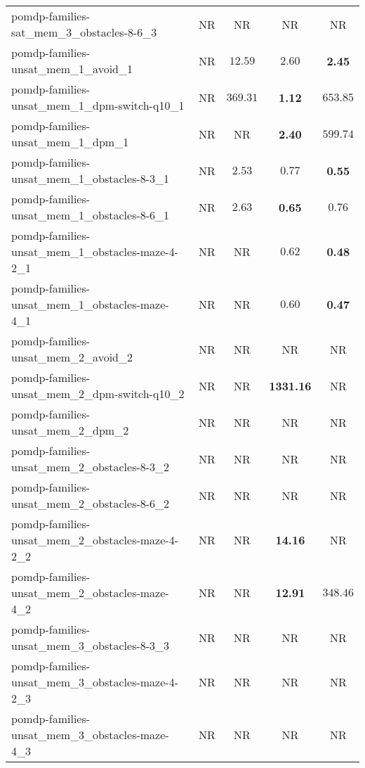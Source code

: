 \begin{tabular}{lcccc}
pomdp-families-sat\_mem\_3\_obstacles-8-6\_3 & NR & NR & NR & NR \\
pomdp-families-unsat\_mem\_1\_avoid\_1 & NR & $12.59$ & $2.60$ & \textbf{2.45} \\
pomdp-families-unsat\_mem\_1\_dpm-switch-q10\_1 & NR & $369.31$ & \textbf{1.12} & $653.85$ \\
pomdp-families-unsat\_mem\_1\_dpm\_1 & NR & NR & \textbf{2.40} & $599.74$ \\
pomdp-families-unsat\_mem\_1\_obstacles-8-3\_1 & NR & $2.53$ & $0.77$ & \textbf{0.55} \\
pomdp-families-unsat\_mem\_1\_obstacles-8-6\_1 & NR & $2.63$ & \textbf{0.65} & $0.76$ \\
pomdp-families-unsat\_mem\_1\_obstacles-maze-4-2\_1 & NR & NR & $0.62$ & \textbf{0.48} \\
pomdp-families-unsat\_mem\_1\_obstacles-maze-4\_1 & NR & NR & $0.60$ & \textbf{0.47} \\
pomdp-families-unsat\_mem\_2\_avoid\_2 & NR & NR & NR & NR \\
pomdp-families-unsat\_mem\_2\_dpm-switch-q10\_2 & NR & NR & \textbf{1331.16} & NR \\
pomdp-families-unsat\_mem\_2\_dpm\_2 & NR & NR & NR & NR \\
pomdp-families-unsat\_mem\_2\_obstacles-8-3\_2 & NR & NR & NR & NR \\
pomdp-families-unsat\_mem\_2\_obstacles-8-6\_2 & NR & NR & NR & NR \\
pomdp-families-unsat\_mem\_2\_obstacles-maze-4-2\_2 & NR & NR & \textbf{14.16} & NR \\
pomdp-families-unsat\_mem\_2\_obstacles-maze-4\_2 & NR & NR & \textbf{12.91} & $348.46$ \\
pomdp-families-unsat\_mem\_3\_obstacles-8-3\_3 & NR & NR & NR & NR \\
pomdp-families-unsat\_mem\_3\_obstacles-maze-4-2\_3 & NR & NR & NR & NR \\
pomdp-families-unsat\_mem\_3\_obstacles-maze-4\_3 & NR & NR & NR & NR \\
\bottomrule
\end{tabular}
